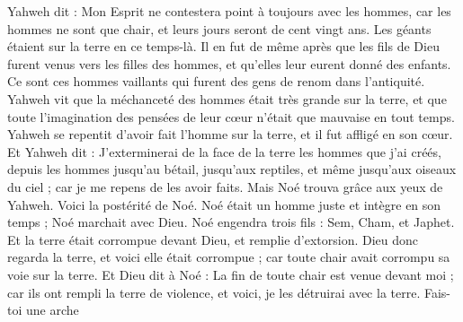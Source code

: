 \begin{multicols}{2}
Yahweh dit : Mon Esprit ne contestera point à toujours avec les hommes, car les hommes ne sont que chair, et leurs jours seront de cent vingt ans.
Les géants étaient sur la terre en ce temps-là. Il en fut de même après que les fils de Dieu furent venus vers les filles des hommes, et qu’elles leur eurent donné des enfants. Ce sont ces hommes vaillants qui furent des gens de renom dans l’antiquité.
Yahweh vit que la méchanceté des hommes était très grande sur la terre, et que toute l'imagination des pensées de leur cœur n'était que mauvaise en tout temps.
Yahweh se repentit d'avoir fait l'homme sur la terre, et il fut affligé en son cœur.
Et Yahweh dit : J'exterminerai de la face de la terre les hommes que j'ai créés, depuis les hommes jusqu'au bétail, jusqu'aux reptiles, et même jusqu'aux oiseaux du ciel ; car je me repens de les avoir faits.
Mais Noé trouva grâce aux yeux de Yahweh.
Voici la postérité de Noé. Noé était un homme juste et intègre en son temps ; Noé marchait avec Dieu.
Noé engendra trois fils : Sem, Cham, et Japhet.
Et la terre était corrompue devant Dieu, et remplie d'extorsion.
Dieu donc regarda la terre, et voici elle était corrompue ; car toute chair avait corrompu sa voie sur la terre.
Et Dieu dit à Noé : La fin de toute chair est venue devant moi ; car ils ont rempli la terre de violence, et voici, je les détruirai avec la terre.
Fais-toi une arche
\end{multicols}

